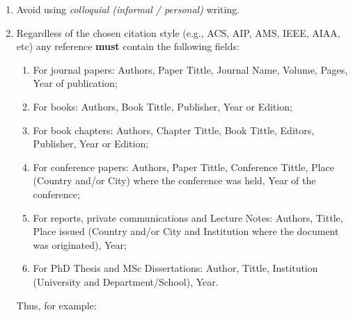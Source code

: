 \documentclass[14pt,twoside]{report}
\begin{document}
\begin{enumerate}
\begin{enumerate}
%
\item Avoid using {\it colloquial (informal / personal)} writing.
%
\item Regardless of the chosen citation style (e.g., ACS, AIP, AMS, IEEE, AIAA, etc) any reference {\bf must} contain the following fields: 
\begin{enumerate}
\item For journal papers: Authors, Paper Tittle, Journal Name, Volume, Pages, Year of publication;
\item For books: Authors, Book Tittle, Publisher, Year or Edition;
\item For book chapters: Authors, Chapter Tittle, Book Tittle, Editors, Publisher, Year or Edition;
\item For conference papers: Authors, Paper Tittle, Conference Tittle, Place (Country and/or City) where the conference was held, Year of the conference;
\item For reports,  private communications and Lecture Notes: Authors, Tittle, Place issued (Country and/or City and Institution where the document was originated), Year;
\item For PhD Thesis and MSc Dissertations: Author, Tittle, Institution (University and Department/School), Year.
\end{enumerate}  
Thus, for example:
%
\end{enumerate}


\end{enumerate}
\end{document}
